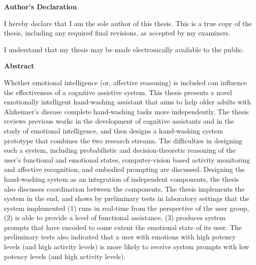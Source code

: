 \pagestyle{plain}
\setcounter{page}{2}

\cleardoublepage %
 



\begin{center}\textbf{Author's Declaration}\end{center}

  \noindent
I hereby declare that I am the sole author of this thesis. This is a true copy of the thesis, including any required final revisions, as accepted by my examiners.

  \bigskip
  
  \noindent
I understand that my thesis may be made electronically available to the public.

\cleardoublepage


\begin{center}\textbf{Abstract}\end{center}

Whether emotional intelligence (or, affective reasoning) is included can influence the effectiveness of a cognitive assistive system. This thesis presents a novel emotionally intelligent hand-washing assistant that aims to help older adults with Alzheimer's disease complete hand-washing tasks more independently. The thesis reviews previous works in the development of cognitive assistants and in the study of emotional intelligence, and then designs a hand-washing system prototype that combines the two research streams. The difficulties in designing such a system, including probabilistic and decision-theoretic reasoning of the user's functional and emotional states, computer-vision based activity monitoring and affective recognition, and embodied prompting are discussed. Designing the hand-washing system as an integration of independent components, the thesis also discusses coordination between the components. The thesis implements the system in the end, and shows by preliminary tests in laboratory settings that the system implemented (1) runs in real-time from the perspective of the user group, (2) is able to provide a level of functional assistance, (3) produces system prompts that have encoded to some extent the emotional state of its user. The preliminary tests also indicated that a user with emotions with high potency levels (and high activity levels) is more likely to receive system prompts with low potency levels (and high activity levels).

